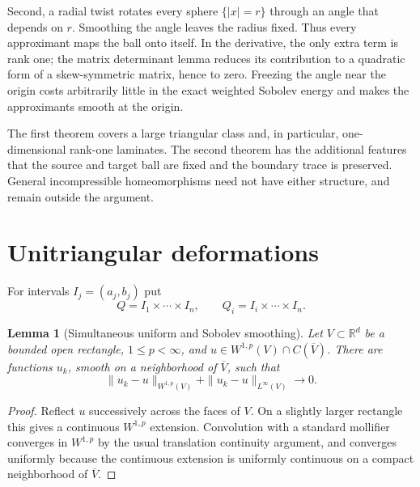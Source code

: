 \documentclass[11pt]{article}
\newtheorem{lemma}[theorem]{Lemma}
\theoremstyle{remark}
\newcommand{\R}{\mathbb{R}}
\begin{document}
Second, a radial twist rotates every sphere $\{|x|=r\}$ through an angle that
depends on $r$.  Smoothing the angle leaves the radius fixed.  Thus every
approximant maps the ball onto itself.  In the derivative, the only extra term
is rank one; the matrix determinant lemma reduces its contribution to a
quadratic form of a skew-symmetric matrix, hence to zero.  Freezing the angle
near the origin costs arbitrarily little in the exact weighted Sobolev energy
and makes the approximants smooth at the origin.

The first theorem covers a large triangular class and, in particular,
one-dimensional rank-one laminates.  The second theorem has the additional
features that the source and target ball are fixed and the boundary trace is
preserved.  General incompressible homeomorphisms need not have either
structure, and remain outside the argument.

\section{Unitriangular deformations}

For intervals $I_j=(a_j,b_j)$ put
\[
 Q=I_1\times\cdots\times I_n,
 \qquad Q_i=I_i\times\cdots\times I_n.
\]

\begin{lemma}[Simultaneous uniform and Sobolev smoothing]\label{lem:density}
Let $V\subset\R^d$ be a bounded open rectangle, $1\leq p<\infty$, and
$u\in W^{1,p}(V)\cap C(\overline V)$.  There are functions $u_k$, smooth on
a neighborhood of $\overline V$, such that
\[
 \|u_k-u\|_{W^{1,p}(V)}+\|u_k-u\|_{L^\infty(V)}\longrightarrow0.
\]
\end{lemma}

\begin{proof}
Reflect $u$ successively across the faces of $V$.  On a slightly larger
rectangle this gives a continuous $W^{1,p}$ extension.  Convolution with a
standard mollifier converges in $W^{1,p}$ by the usual translation
continuity argument, and converges uniformly because the continuous
extension is uniformly continuous on a compact neighborhood of
$\overline V$.
\end{proof}
\end{document}
